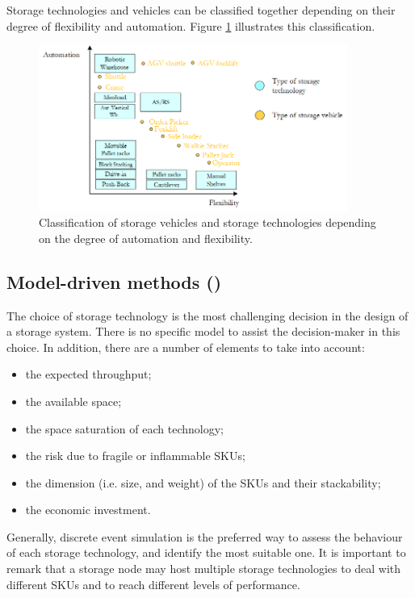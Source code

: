 \clearpage

Storage technologies and vehicles can be classified together depending on their degree of flexibility and automation. Figure \ref{fig_technologies} illustrates this classification.

\begin{figure}[hbt!]
\centering
\includegraphics[width=0.9\textwidth]{SectionWarehouses/design_figures/fig_technologies.png}
\captionsetup{type=figure}
\caption{Classification of storage vehicles and storage technologies depending on the degree of automation and flexibility.}
\label{fig_technologies}
\end{figure}

\subsection{Model-driven methods ()}
The choice of storage technology is the most challenging decision in the design of a storage system. There is no specific model to assist the decision-maker in this choice. In addition, there are a number of elements to take into account:

\begin{itemize}
    \item the expected throughput;
    \item the available space;
    \item the space saturation of each technology;
    \item the risk due to fragile or inflammable SKUs;
    \item the dimension (i.e. size, and weight) of the SKUs and their stackability;
    \item the economic investment.

\end{itemize}

Generally, discrete event simulation is the preferred way to assess the behaviour of each storage technology, and identify the most suitable one. It is important to remark that a storage node may host multiple storage technologies to deal with different SKUs and to reach different levels of performance.

